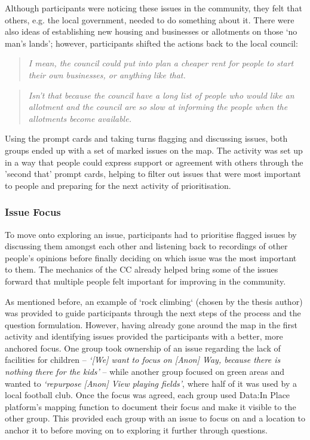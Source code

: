 Although participants were noticing these issues in the community, they felt that others, e.g. the local government, needed to do something about it. There were also ideas of establishing new housing and businesses or allotments on those `no man's lands'; however, participants shifted the actions back to the local council: 
\begin{quote}
    \textit{I mean, the council could put into plan a cheaper rent for people to start their own businesses, or anything like that.}
\end{quote}
\begin{quote}
    \textit{Isn't that because the council have a long list of people who would like an allotment and the council are so slow at informing the people when the allotments become available.}
\end{quote}

Using the prompt cards and taking turns flagging and discussing issues, both groups ended up with a set of marked issues on the map. The activity was set up in a way that people could express support or agreement with others through the 'second that' prompt cards, helping to filter out issues that were most important to people and preparing for the next activity of prioritisation.

\subsubsection{Issue Focus}
To move onto exploring an issue, participants had to prioritise flagged issues by discussing them amongst each other and listening back to recordings of other people's opinions before finally deciding on which issue was the most important to them. The mechanics of the CC already helped bring some of the issues forward that multiple people felt important for improving in the community.

As mentioned before, an example of `rock climbing` (chosen by the thesis author) was provided to guide participants through the next steps of the process and the question formulation. However, having already gone around the map in the first activity and identifying issues provided the participants with a better, more anchored focus. One group took ownership of an issue regarding the lack of facilities for children -- \textit{`[We] want to focus on [Anon] Way, because there is nothing there for the kids'} -- while another group focused on green areas and wanted to \textit{`repurpose [Anon] View playing fields'}, where half of it was used by a local football club. Once the focus was agreed, each group used Data:In Place platform's mapping function to document their focus and make it visible to the other group. This provided each group with an issue to focus on and a location to anchor it to before moving on to exploring it further through questions.

